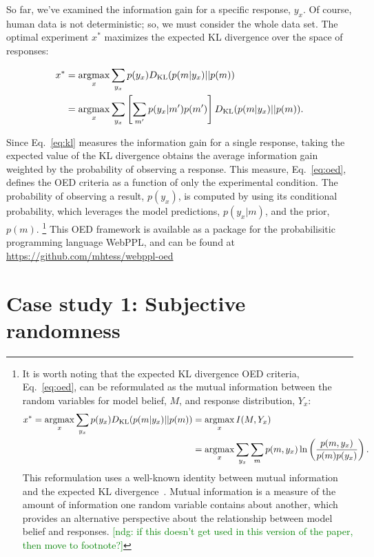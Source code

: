 \documentclass{article}
\newcommand{\ndg}[1]{\textcolor{Green}{[ndg: #1]}}
\newcommand{\argmax}{\operatornamewithlimits{argmax}}
\begin{document}
So far, we've examined the information gain for a specific response, $y_x$.
Of course, human data is not deterministic; so, we must consider the whole data set.
The optimal experiment $x^*$ maximizes the expected KL divergence over the space of responses:

\begin{align}
x^{*} &= \argmax_{x} \sum\limits_{y_x} p(y_x) D_{\text{KL}}(p(m|y_x) || p(m)) \notag \\
    &= \argmax_{x} \sum\limits_{y_x} \left[\sum\limits_{m'} p(y_x|m')p(m')\right] D_{\text{KL}}(p(m|y_x) || p(m)). \label{eq:oed}
\end{align}

Since Eq.~\ref{eq:kl} measures the information gain for a single response, taking the expected value of the KL divergence obtains the average information gain weighted by the probability of observing a response. This measure, Eq.~\ref{eq:oed}, defines the OED criteria as a function of only the experimental condition. The probability of observing a result, $p(y_x)$, is computed by using its conditional probability, which leverages the model predictions, $p(y_x|m)$, and the prior, $p(m)$.
\footnote{It is worth noting that the expected KL divergence OED criteria, Eq.~\ref{eq:oed}, can be reformulated as the mutual information between the random variables for model belief, $M$, and response distribution, $Y_x$:
\begin{align}
x^* = \argmax_{x} \sum\limits_{y_x} p(y_x) D_{\text{KL}}(p(m|y_x) || p(m)) &= \argmax_{x} I(M, Y_x) \notag \\
    &= \argmax_{x} \sum\limits_{y_x} \sum\limits_{m} p(m, y_x) \ln \left( \frac{p(m, y_x)}{p(m)p(y_x)}\right). \label{eq:mi}
\end{align}
This reformulation uses a well-known identity between mutual information and the expected KL divergence~\cite{cover91:eit}. Mutual information is a measure of the amount of information one random variable contains about another, which provides an alternative perspective about the relationship between model belief and responses.
\ndg{if this doesn't get used in this version of the paper, then move to footnote?}
}
This OED framework is available as a package for the probabilisitic programming language WebPPL, and can be found at \url{https://github.com/mhtess/webppl-oed}

\section{Case study 1: Subjective randomness}
\label{s:tutorial}
\end{document}
